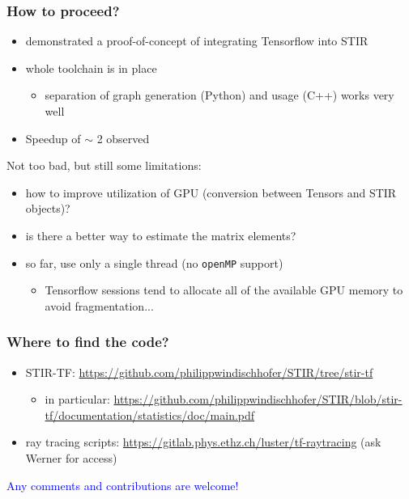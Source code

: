 \documentclass{beamer}
\begin{document}
\begin{frame}
  \frametitle{How to proceed?}
  \begin{itemize}
    \item demonstrated a proof-of-concept of integrating Tensorflow into STIR
    \item whole toolchain is in place
      \begin{itemize}
        \item separation of graph generation (Python) and usage (C++) works very well
      \end{itemize}
      \pause
    \item Speedup of $\sim$ 2 observed
  \end{itemize}

  Not too bad, but still some limitations:
  \begin{itemize}
  \item how to improve utilization of GPU (conversion between Tensors and STIR objects)?
    \pause
  \item is there a better way to estimate the matrix elements?
    \pause
    \item so far, use only a single thread (no \texttt{openMP} support)
      \begin{itemize}
        \item Tensorflow sessions tend to allocate all of the available GPU memory to avoid fragmentation...
      \end{itemize}
  \end{itemize}
\end{frame}

\begin{frame}
  \frametitle{Where to find the code?}
  \begin{itemize}
    \item STIR-TF: \url{https://github.com/philippwindischhofer/STIR/tree/stir-tf}
      \begin{itemize}
        \item in particular: \url{https://github.com/philippwindischhofer/STIR/blob/stir-tf/documentation/statistics/doc/main.pdf}
      \end{itemize}
    \item ray tracing scripts: \url{https://gitlab.phys.ethz.ch/luster/tf-raytracing} (ask Werner for access)
  \end{itemize}

  \begin{center}
    \textcolor{blue}{Any comments and contributions are welcome!}
  \end{center}
\end{frame}
\end{document}
